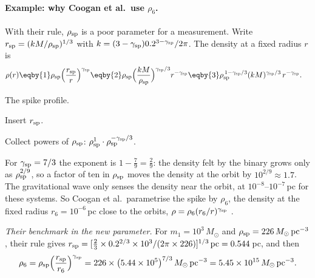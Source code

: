 \paragraph{Example: why Coogan et al.\ use $\rho_6$.}
With their rule, $\rho_{\rm sp}$ is a poor parameter for a measurement. Write $r_{\rm sp}=(kM/\rho_{\rm sp})^{1/3}$ with $k=(3-\gamma_{\rm sp})0.2^{3-\gamma_{\rm sp}}/2\pi$. The density at a fixed radius $r$ is
\begin{align*}
  \rho(r)
  &\eqby{1}\rho_{\rm sp}\Big(\frac{r_{\rm sp}}{r}\Big)^{\gamma_{\rm sp}}
  \eqby{2}\rho_{\rm sp}\Big(\frac{kM}{\rho_{\rm sp}}\Big)^{\gamma_{\rm sp}/3}r^{-\gamma_{\rm sp}}
  \eqby{3}\rho_{\rm sp}^{\,1-\gamma_{\rm sp}/3}(kM)^{\gamma_{\rm sp}/3}\,r^{-\gamma_{\rm sp}} .
\end{align*}
\begin{explain}
  \item The spike profile.
  \item Insert $r_{\rm sp}$.
  \item Collect powers of $\rho_{\rm sp}$: $\rho_{\rm sp}^1\cdot\rho_{\rm sp}^{-\gamma_{\rm sp}/3}$.
\end{explain}
For $\gamma_{\rm sp}=7/3$ the exponent is $1-\tfrac79=\tfrac29$: the density felt by the binary grows only as $\rho_{\rm sp}^{2/9}$, so a factor of ten in $\rho_{\rm sp}$ moves the density at the orbit by $10^{2/9}\approx1.7$. The gravitational wave only senses the density near the orbit, at $10^{-8}$--$10^{-7}$\,pc for these systems. So Coogan et al.\ parametrise the spike by $\rho_6$, the density at the fixed radius $r_6=10^{-6}$\,pc close to the orbits, $\rho=\rho_6(r_6/r)^{\gamma_{\rm sp}}$ \cite[eqs.~(3)--(4)]{Coogan2022}.

\emph{Their benchmark in the new parameter.} For $m_1=10^3\,M_\odot$ and $\rho_{\rm sp}=226\,M_\odot\,{\rm pc}^{-3}$, their rule gives $r_{\rm sp}=[\tfrac23\times0.2^{2/3}\times10^3/(2\pi\times226)]^{1/3}\,{\rm pc}=0.544$\,pc, and then
\[
  \rho_6=\rho_{\rm sp}\Big(\frac{r_{\rm sp}}{r_6}\Big)^{\gamma_{\rm sp}}
  =226\times\big(5.44\times10^5\big)^{7/3}\,M_\odot\,{\rm pc}^{-3}
  =5.45\times10^{15}\,M_\odot\,{\rm pc}^{-3}.
\]

